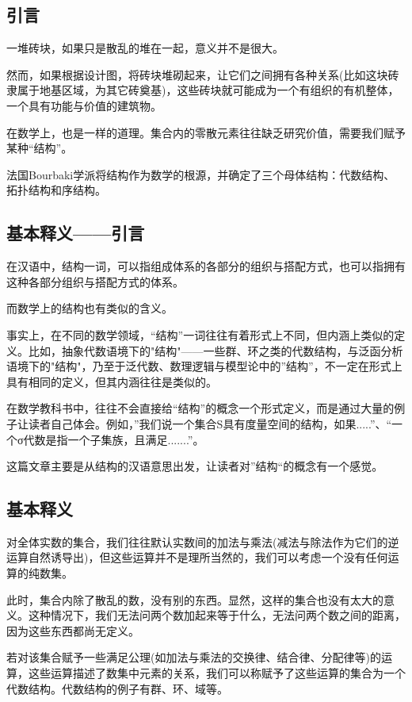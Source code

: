 

\subsection{引言}
一堆砖块，如果只是散乱的堆在一起，意义并不是很大。

然而，如果根据设计图，将砖块堆砌起来，让它们之间拥有各种关系(比如这块砖隶属于地基区域，为其它砖奠基)，这些砖块就可能成为一个有组织的有机整体，一个具有功能与价值的建筑物。

在数学上，也是一样的道理。集合内的零散元素往往缺乏研究价值，需要我们赋予某种“结构”。

法国Bourbaki学派将结构作为数学的根源，并确定了三个母体结构：代数结构、拓扑结构和序结构。

\subsection{基本释义——引言}
在汉语中，结构一词，可以指组成体系的各部分的组织与搭配方式，也可以指拥有这种各部分组织与搭配方式的体系。

而数学上的结构也有类似的含义。

事实上，在不同的数学领域，“结构”一词往往有着形式上不同，但内涵上类似的定义。比如，抽象代数语境下的"结构"——一些群、环之类的代数结构，与泛函分析语境下的"结构"，乃至于泛代数、数理逻辑与模型论中的”结构”，不一定在形式上具有相同的定义，但其内涵往往是类似的。

在数学教科书中，往往不会直接给“结构”的概念一个形式定义，而是通过大量的例子让读者自己体会。例如，”我们说一个集合S具有度量空间的结构，如果.....”、“一个σ代数是指一个子集族，且满足.......”。

这篇文章主要是从结构的汉语意思出发，让读者对”结构“的概念有一个感觉。

\subsection{基本释义}

对全体实数的集合，我们往往默认实数间的加法与乘法(减法与除法作为它们的逆运算自然诱导出)，但这些运算并不是理所当然的，我们可以考虑一个没有任何运算的纯数集。

此时，集合内除了散乱的数，没有别的东西。显然，这样的集合也没有太大的意义。这种情况下，我们无法问两个数加起来等于什么，无法问两个数之间的距离，因为这些东西都尚无定义。 

若对该集合赋予一些满足公理(如加法与乘法的交换律、结合律、分配律等)的运算，这些运算描述了数集中元素的关系，我们可以称赋予了这些运算的集合为一个代数结构。代数结构的例子有群、环、域等。

